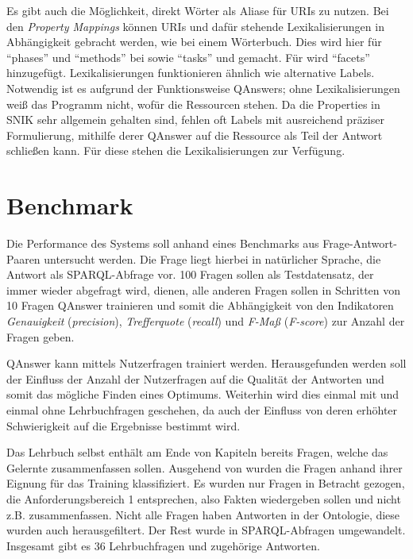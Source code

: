 \documentclass[utf8,biblatex]{lni}
\begin{document}
Es gibt auch die Möglichkeit, direkt Wörter als Aliase für URIs zu nutzen.
Bei den \emph{Property Mappings} können URIs und dafür stehende Lexikalisierungen in Abhängigkeit gebracht werden, wie bei einem Wörterbuch.
Dies wird hier für \enquote{phases} und \enquote{methods} bei  sowie \enquote{tasks} und  gemacht.
Für  wird \enquote{facets} hinzugefügt.
Lexikalisierungen funktionieren ähnlich wie alternative Labels.
Notwendig ist es aufgrund der Funktionsweise QAnswers; ohne Lexikalisierungen weiß das Programm nicht, wofür die Ressourcen stehen.
Da die Properties in SNIK sehr allgemein gehalten sind, fehlen oft Labels mit ausreichend präziser Formulierung, mithilfe derer QAnswer auf die Ressource als Teil der Antwort schließen kann.
Für diese stehen die Lexikalisierungen zur Verfügung.

\section{Benchmark}

Die Performance des Systems soll anhand eines Benchmarks aus Frage-Antwort-Paaren untersucht werden.
Die Frage liegt hierbei in natürlicher Sprache, die Antwort als SPARQL-Abfrage vor.
100 Fragen sollen als Testdatensatz, der immer wieder abgefragt wird, dienen,
alle anderen Fragen sollen in Schritten von 10 Fragen QAnswer trainieren und somit die Abhängigkeit von den Indikatoren \emph{Genauigkeit} (\emph{precision}), \emph{Trefferquote} (\emph{recall}) und \emph{F-Maß} (\emph{F-score}) zur Anzahl der Fragen geben.

QAnswer kann mittels Nutzerfragen trainiert werden.
Herausgefunden werden soll der Einfluss der Anzahl der Nutzerfragen auf die Qualität der Antworten und somit das mögliche Finden eines Optimums.
Weiterhin wird dies einmal mit und einmal ohne Lehrbuchfragen geschehen, da auch der Einfluss von deren erhöhter Schwierigkeit auf die Ergebnisse bestimmt wird.

Das Lehrbuch selbst \cite{bb} enthält am Ende von Kapiteln bereits Fragen, welche das Gelernte zusammenfassen sollen.
Ausgehend von \cite{arneba} wurden die Fragen anhand ihrer Eignung für das Training klassifiziert.
Es wurden nur Fragen in Betracht gezogen, die Anforderungsbereich 1 entsprechen, also Fakten wiedergeben sollen und nicht z.B. zusammenfassen.
Nicht alle Fragen haben Antworten in der Ontologie, diese wurden auch herausgefiltert.
Der Rest wurde in SPARQL-Abfragen umgewandelt.
Insgesamt gibt es 36 Lehrbuchfragen und zugehörige Antworten.
\end{document}
